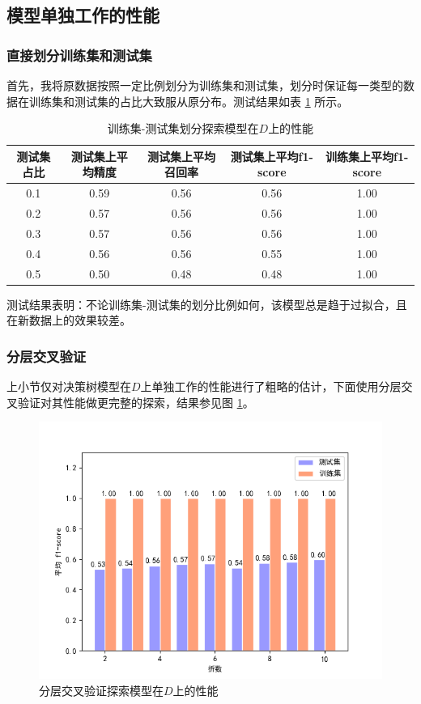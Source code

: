\documentclass[12pt,a4paper]{article}
\theoremstyle{definition}
\begin{document}
\subsection{模型单独工作的性能}
\label{sec:pca_res_com}

\subsubsection{直接划分训练集和测试集}

首先，我将原数据按照一定比例划分为训练集和测试集，划分时保证每一类型的数据在训练集和测试集的占比大致服从原分布。测试结果如表 \ref{tab:train-test} 所示。

\begin{table}[H]
	\renewcommand\arraystretch{1.35}
	\caption{训练集-测试集划分探索模型在$D$上的性能}
	\label{tab:train-test}
	\centering
	
	\begin{tabular}{c|c|c|c|c}
		\centering
		测试集占比 & 测试集上平均精度 & 测试集上平均召回率 & 测试集上平均f1-score & 训练集上平均f1-score \\
		\hline
		0.1 & 0.59 & 0.56 & 0.56 & 1.00 \\
		0.2 & 0.57 & 0.56 & 0.56 & 1.00 \\	
		0.3 & 0.57 & 0.56 & 0.56 & 1.00 \\	
		0.4 & 0.56 & 0.56 & 0.55 & 1.00 \\
		0.5 & 0.50 & 0.48 & 0.48 & 1.00 \\
	\end{tabular}
\end{table}

测试结果表明：不论训练集-测试集的划分比例如何，该模型总是趋于过拟合，且在新数据上的效果较差。

\subsubsection{分层交叉验证}

上小节仅对决策树模型在$D$上单独工作的性能进行了粗略的估计，下面使用分层交叉验证对其性能做更完整的探索，结果参见图 \ref{fig:cv_bar}。

\begin{figure}[H]
	\centering
	\includegraphics[width=0.8\linewidth]{img/cv_bar.png}
	\caption{分层交叉验证探索模型在$D$上的性能}
	\label{fig:cv_bar}
\end{figure}
\end{document}
